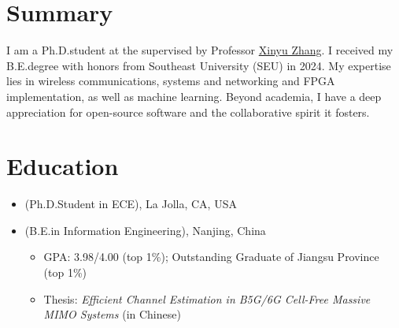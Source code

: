 \documentclass{color-cv}
\begin{document}

\maketitle

\section{Summary}
I am a Ph.D.\@ student at the  supervised by Professor \href{https://xyzhang.ucsd.edu}{\color{black}Xinyu Zhang}.
I received my B.E.\@ degree with honors from Southeast University (SEU) in 2024.
My expertise lies in wireless communications, systems and networking and FPGA implementation, as well as machine learning.
Beyond academia, I have a deep appreciation for open-source software and the collaborative spirit it fosters.

\section{Education}
\begin{itemize}
  \item {} (Ph.D.\@ Student in ECE), La Jolla, CA, USA
  \item {} (B.E.\@ in Information Engineering), Nanjing, China
    \begin{itemize}
      \item GPA: 3.98/4.00 (top 1\%); Outstanding Graduate of Jiangsu Province (top 1\%)
      \item Thesis: \textit{Efficient Channel Estimation in B5G/6G Cell-Free Massive MIMO Systems} (in Chinese)
    \end{itemize}
\end{itemize}
\end{document}
